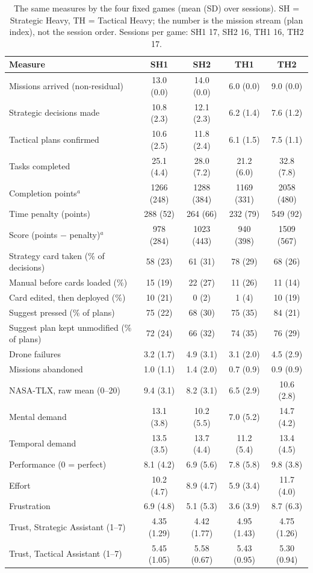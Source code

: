 \begin{table}[htbp]
\centering
\footnotesize
\caption{The same measures by the four fixed games (mean (SD) over sessions). SH = Strategic Heavy, TH = Tactical Heavy; the number is the mission stream (plan index), not the session order. Sessions per game: SH1 17, SH2 16, TH1 16, TH2 17.}
\label{tab:games}
\begin{tabular}{lcccc}
\toprule
\textbf{Measure} & \textbf{SH1} & \textbf{SH2} & \textbf{TH1} & \textbf{TH2} \\
\midrule
Missions arrived (non-residual) & 13.0 (0.0) & 14.0 (0.0) & 6.0 (0.0) & 9.0 (0.0) \\
Strategic decisions made & 10.8 (2.3) & 12.1 (2.3) & 6.2 (1.4) & 7.6 (1.2) \\
Tactical plans confirmed & 10.6 (2.5) & 11.8 (2.4) & 6.1 (1.5) & 7.5 (1.1) \\
Tasks completed & 25.1 (4.4) & 28.0 (7.2) & 21.2 (6.0) & 32.8 (7.8) \\
Completion points$^a$ & 1266 (248) & 1288 (384) & 1169 (331) & 2058 (480) \\
Time penalty (points) & 288 (52) & 264 (66) & 232 (79) & 549 (92) \\
Score (points $-$ penalty)$^a$ & 978 (284) & 1023 (443) & 940 (398) & 1509 (567) \\
Strategy card taken (\% of decisions) & 58 (23) & 61 (31) & 78 (29) & 68 (26) \\
Manual before cards loaded (\%) & 15 (19) & 22 (27) & 11 (26) & 11 (14) \\
Card edited, then deployed (\%) & 10 (21) & 0 (2) & 1 (4) & 10 (19) \\
Suggest pressed (\% of plans) & 75 (22) & 68 (30) & 75 (35) & 84 (21) \\
Suggest plan kept unmodified (\% of plans) & 72 (24) & 66 (32) & 74 (35) & 76 (29) \\
Drone failures & 3.2 (1.7) & 4.9 (3.1) & 3.1 (2.0) & 4.5 (2.9) \\
Missions abandoned & 1.0 (1.1) & 1.4 (2.0) & 0.7 (0.9) & 0.9 (0.9) \\
NASA-TLX, raw mean (0--20) & 9.4 (3.1) & 8.2 (3.1) & 6.5 (2.9) & 10.6 (2.8) \\
\quad Mental demand & 13.1 (3.8) & 10.2 (5.5) & 7.0 (5.2) & 14.7 (4.2) \\
\quad Temporal demand & 13.5 (3.5) & 13.7 (4.4) & 11.2 (5.4) & 13.4 (4.5) \\
\quad Performance (0 = perfect) & 8.1 (4.2) & 6.9 (5.6) & 7.8 (5.8) & 9.8 (3.8) \\
\quad Effort & 10.2 (4.7) & 8.9 (4.7) & 5.9 (3.4) & 11.7 (4.0) \\
\quad Frustration & 6.9 (4.8) & 5.1 (5.3) & 3.6 (3.9) & 8.7 (6.3) \\
Trust, Strategic Assistant (1--7) & 4.35 (1.29) & 4.42 (1.77) & 4.95 (1.43) & 4.75 (1.26) \\
Trust, Tactical Assistant (1--7) & 5.45 (1.05) & 5.58 (0.67) & 5.43 (0.95) & 5.30 (0.94) \\
\bottomrule
\end{tabular}
\end{table}
